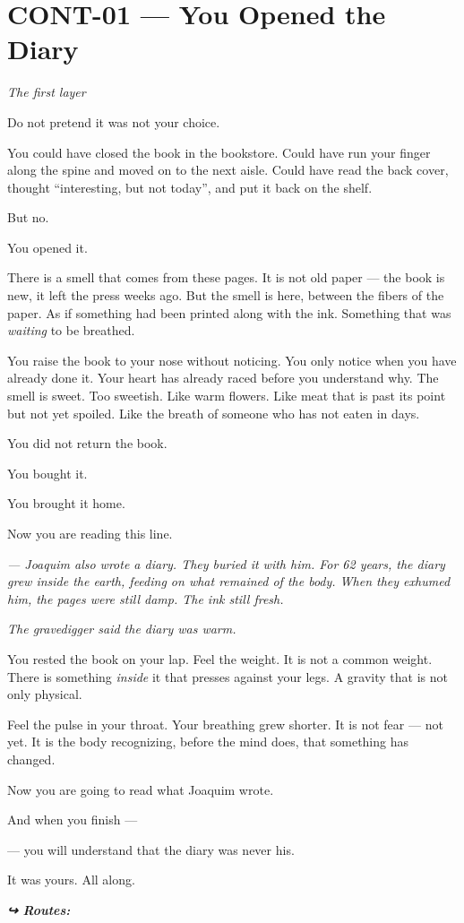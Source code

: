 \section*{\textbf{CONT-01} --- You Opened the Diary}

\noindent \textit{The first layer}

\noindent Do not pretend it was not your choice.

\noindent You could have closed the book in the bookstore. Could have run your finger along the spine and moved on to the next aisle. Could have read the back cover, thought \textquotedblleft{}interesting, but not today\textquotedblright{}, and put it back on the shelf.

\noindent But no.

\noindent You opened it.

\noindent There is a smell that comes from these pages. It is not old paper --- the book is new, it left the press weeks ago. But the smell is here, between the fibers of the paper. As if something had been printed along with the ink. Something that was \textit{waiting} to be breathed.

\noindent You raise the book to your nose without noticing. You only notice when you have already done it. Your heart has already raced before you understand why. The smell is sweet. Too sweetish. Like warm flowers. Like meat that is past its point but not yet spoiled. Like the breath of someone who has not eaten in days.

\noindent You did not return the book.

\noindent You bought it.

\noindent You brought it home.

\noindent Now you are reading this line.

\noindent \textit{--- Joaquim also wrote a diary. They buried it with him. For 62 years, the diary grew inside the earth, feeding on what remained of the body. When they exhumed him, the pages were still damp. The ink still fresh.}

\noindent \textit{The gravedigger said the diary was warm.}

\noindent You rested the book on your lap. Feel the weight. It is not a common weight. There is something \textit{inside} it that presses against your legs. A gravity that is not only physical.

\noindent Feel the pulse in your throat. Your breathing grew shorter. It is not fear --- not yet. It is the body recognizing, before the mind does, that something has changed.

\noindent Now you are going to read what Joaquim wrote.

\noindent And when you finish ---

\noindent --- you will understand that the diary was never his.

\noindent It was yours. All along.

\vspace{0.5em}
\noindent\textit{\textbf{↪ Routes:}  \rotasep {} \rotasep {}}
